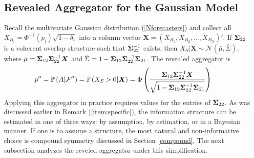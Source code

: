 \documentclass[12pt]{article}
\renewcommand{\P}{\mathbb{P}}
\theoremstyle{definition}
\theoremstyle{definition}
\def\one{{\bf 1}}
\def\F{{\cal F}}
\def\P{{\mathbb P}}
\def\probit{p_{\rm probit}}
\begin{document}
\subsection{Revealed Aggregator for the Gaussian Model}
Recall the multivariate Gaussian distribution (\ref{Nforecasters}) and collect all $X_{B_i} =
\Phi^{-1}(p_i)\sqrt{1-\delta_i}$ into a column vector $\boldsymbol{X} = (X_{B_1}, X_{B_2}, \dots,
X_{B_N})'$. If ${\bf\Sigma}_{22}$ is a
coherent overlap structure such that ${\bf\Sigma}_{22}^{-1}$ exists, then $X_{S} | \boldsymbol{X} \sim \mathcal{N}\left(\bar{\mu}, \bar{\Sigma}\right)$, where $\bar{\mu} 
  = {\bf \Sigma}_{12} {\bf\Sigma}_{22}^{-1} \boldsymbol{X}$ and $\bar{\Sigma} = 1 - {\bf\Sigma}_{12} {\bf\Sigma}_{22}^{-1} {\bf\Sigma}_{21}$. 
%
The revealed aggregator is
\begin{align}
p'' & =  \P\left(A  | \F''\right) =  \P\left(X_{S} > 0 | \boldsymbol{X}\right) = \Phi\left( \frac{{\bf\Sigma}_{12} {\bf\Sigma}_{22}^{-1} \boldsymbol{X}}
   {\sqrt{1 - {\bf\Sigma}_{12} {\bf\Sigma}_{22}^{-1} {\bf\Sigma}_{21}}}\right) 
\label{GeneralAggregator} \,
\end{align}
Applying this aggregator in practice requires values for the entries of ${\bf\Sigma}_{22}$.
As  was discussed earlier in Remark (\ref{item:specific}), the information structure can be estimated in one of three ways: by
assumption, by estimation, or in a Bayesian manner. If one is to
assume a structure, the most natural and non-informative choice is compound
symmetry discussed in Section \ref{compound}. The next subsection analyzes the reveled aggregator under this simplification. 
%
\end{document}
